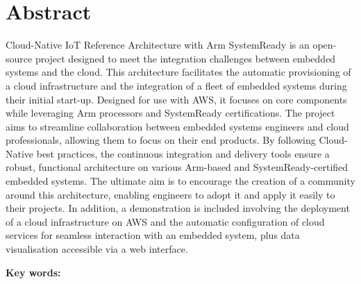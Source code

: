 
\chapter*{Abstract}


Cloud-Native IoT Reference Architecture with Arm SystemReady is an open-source project designed to meet the integration challenges between embedded systems and the cloud. This architecture facilitates the automatic provisioning of a cloud infrastructure and the integration of a fleet of embedded systems during their initial start-up. Designed for use with AWS, it focuses on core components while leveraging Arm processors and SystemReady certifications. The project aims to streamline collaboration between embedded systems engineers and cloud professionals, allowing them to focus on their end products. By following Cloud-Native best practices, the continuous integration and delivery tools ensure a robust, functional architecture on various Arm-based and SystemReady-certified embedded systems. The ultimate aim is to encourage the creation of a community around this architecture, enabling engineers to adopt it and apply it easily to their projects. In addition, a demonstration is included involving the deployment of a cloud infrastructure on AWS and the automatic configuration of cloud services for seamless interaction with an embedded system, plus data visualisation accessible via a web interface.

\vspace{0.5cm}
\textbf{Key words:}
\Keywords
